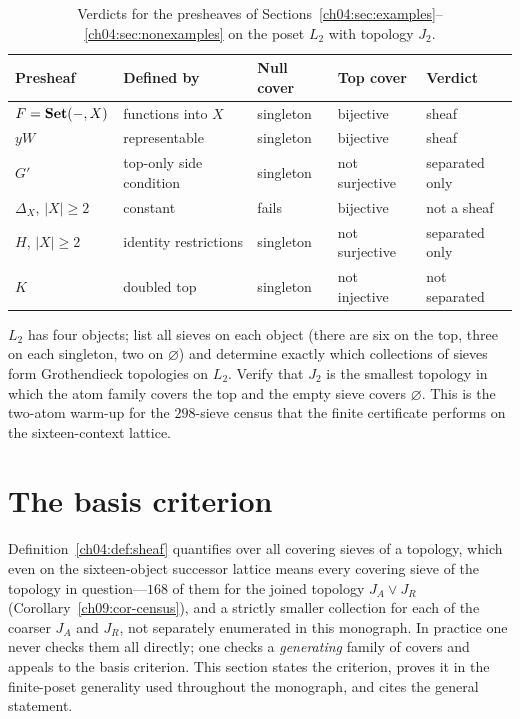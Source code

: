 \begin{table}[ht]
\centering
\begin{tabular}{lllll}
\toprule
Presheaf & Defined by & Null cover & Top cover & Verdict \\
\midrule
$F=\mathbf{Set}(-,X)$ & functions into $X$ & singleton & bijective & sheaf \\
$yW$ & representable & singleton & bijective & sheaf \\
$G'$ & top-only side condition & singleton & not surjective & separated only \\
$\Delta_X$, $|X|\ge2$ & constant & fails & bijective & not a sheaf \\
$H$, $|X|\ge2$ & identity restrictions & singleton & not surjective & separated only \\
$K$ & doubled top & singleton & not injective & not separated \\
\bottomrule
\end{tabular}
\caption{Verdicts for the presheaves of
Sections~\ref{ch04:sec:examples}--\ref{ch04:sec:nonexamples} on the poset
$L_2$ with topology $J_2$.}
\label{ch04:tab:verdicts}
\end{table}

\begin{exercise}\label{ch04:exr:census}
$L_2$ has four objects; list all sieves on each object (there are six on the
top, three on each singleton, two on $\varnothing$) and determine exactly
which collections of sieves form Grothendieck topologies on $L_2$. Verify
that $J_2$ is the smallest topology in which the atom family covers the top
and the empty sieve covers $\varnothing$. This is the two-atom warm-up for
the $298$-sieve census that the finite certificate performs on the
sixteen-context lattice.
\end{exercise}

\section{The basis criterion}\label{ch04:sec:basis}

Definition~\ref{ch04:def:sheaf} quantifies over all covering sieves of a
topology, which even on the sixteen-object successor lattice means every
covering sieve of the topology in question---$168$ of them for the joined
topology $J_A\vee J_R$ (Corollary~\ref{ch09:cor-census}), and a strictly
smaller collection for each of the coarser $J_A$ and $J_R$, not separately
enumerated in this monograph. In practice one never checks them all
directly; one checks a \emph{generating} family of covers and appeals to the
basis criterion. This
section states the criterion, proves it in the finite-poset generality used
throughout the monograph, and cites the general statement.

